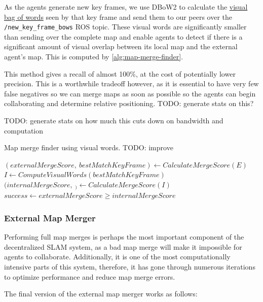 As the agents generate new key frames, we use DBoW2 \autocite{GalvezTRO12} to calculate the \hyperref[sec:visual-bag-of-words]{visual bag of words} seen by that key frame and send them to our peers over the \texttt{/new\_key\_frame\_bows} ROS topic. These visual words are significantly smaller than sending over the complete map and enable agents to detect if there is a significant amount of visual overlap between its local map and the external agent's map. This is computed by \autoref{alg:map-merge-finder}.

This method gives a recall of almost 100\%, at the cost of potentially lower precision. This is a worthwhile tradeoff however, as it is essential to have very few false negatives so we can merge maps as soon as possible so the agents can begin collaborating and determine relative positioning. TODO: generate stats on this?

TODO: generate stats on how much this cuts down on bandwidth and computation

\begin{algorithm}
    \caption{Map merge finder using visual words. TODO: improve}
    \label{alg:map-merge-finder}
    \begin{algorithmic}[1]
        \State $(externalMergeScore,\ bestMatchKeyFrame) \gets CalculateMergeScore(E)$
        \State $I \gets ComputeVisualWords(bestMatchKeyFrame)$
        \State $(internalMergeScore,\ _) \gets CalculateMergeScore(I)$
        \State $success \gets externalMergeScore \geq internalMergeScore$
    \end{algorithmic}
\end{algorithm}

\subsubsection{External Map Merger}
\label{sec:external-map-merger}
Performing full map merges is perhaps the most important component of the decentralized SLAM system, as a bad map merge will make it impossible for agents to collaborate. Additionally, it is one of the most computationally intensive parts of this system, therefore, it has gone through numerous iterations to optimize performance and reduce map merge errors.

The final version of the external map merger works as follows:

